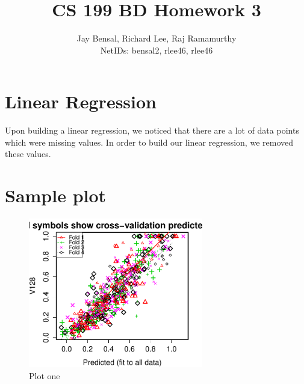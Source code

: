 \documentclass{article}
\begin{document}
\title{CS 199 BD Homework 3}
\author{Jay Bensal, Richard Lee, Raj Ramamurthy\\
  NetIDs: bensal2, rlee46, rlee46}

\maketitle

\section{Linear Regression}
Upon building a linear regression, we noticed that
there are a lot of data points which were missing values. In order to build our
linear regression, we removed these values.

\section{Sample plot}
\begin{figure}[H]
\centering
\includegraphics[width=3.0in]{part1a.pdf}
\caption{Plot one}\label{fig_container} 
\end{figure}
\end{document}
